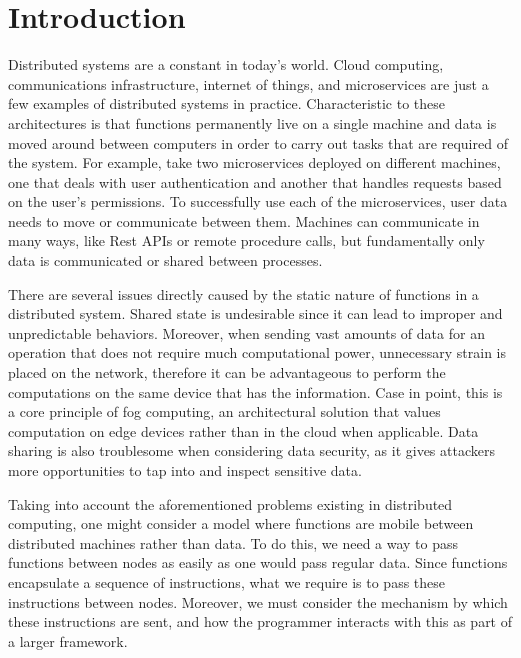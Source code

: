 
\chapter{Introduction}
\label{cha:introduction}



Distributed systems are a constant in today's world. Cloud computing, communications infrastructure, internet of things, and microservices are just a few examples of distributed systems in practice. Characteristic to these architectures is that functions permanently live on a single machine and data is moved around between computers in order to carry out tasks that are required of the system. For example, take two microservices deployed on different machines, one that deals with user authentication and another that handles requests based on the user's permissions. To successfully use each of the microservices, user data needs to move or communicate between them. Machines can communicate in many ways, like Rest APIs or remote procedure calls, but fundamentally only data is communicated or shared between processes.


There are several issues directly caused by the static nature of functions in a distributed system. Shared state is undesirable since it can lead to improper and unpredictable behaviors. 
Moreover, when sending vast amounts of data for an operation that does not require much computational power, unnecessary strain is placed on the network, therefore it can be advantageous to perform the computations on the same device that has the information. Case in point, this is a core principle of fog computing, an architectural solution that values computation on edge devices rather than in the cloud when applicable. Data sharing is also troublesome when considering data security, as it gives attackers more opportunities to tap into and inspect sensitive data.

Taking into account the aforementioned problems existing in distributed computing, one might consider a model where functions are mobile between distributed machines rather than data. To do this, we need a way to pass functions between nodes as easily as one would pass regular data. Since functions encapsulate a sequence of instructions, what we require is to pass these instructions between nodes. Moreover, we must consider the mechanism by which these instructions are sent, and how the programmer interacts with this as part of a larger framework. 

